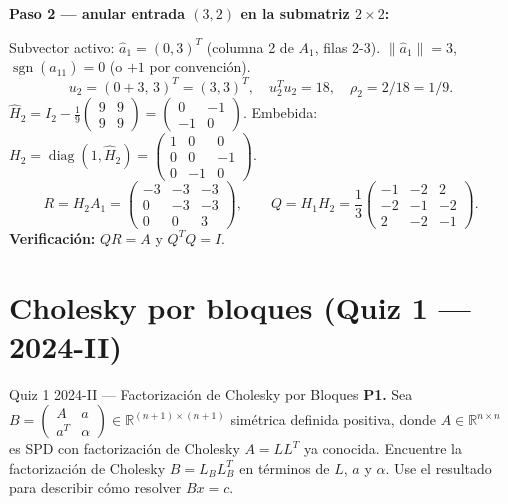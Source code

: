 \documentclass[11pt,a4paper]{article}
\begin{document}
\textbf{Paso 2 --- anular entrada $(3,2)$ en la submatriz $2\times 2$:}

Subvector activo: $\hat{a}_1 = (0,3)^T$ (columna 2 de $A_1$, filas 2-3).
$\|\hat{a}_1\|=3$, $\operatorname{sgn}(\hat{a}_{11})=0$ (o $+1$ por convención).
\[
  u_2 = (0+3,\,3)^T = (3,3)^T,\quad u_2^Tu_2=18, \quad \rho_2 = 2/18 = 1/9.
\]
$\hat{H}_2 = I_2 - \frac{1}{9}\begin{pmatrix}9&9\\9&9\end{pmatrix} = \begin{pmatrix}0&-1\\-1&0\end{pmatrix}$.
Embebida: $H_2 = \operatorname{diag}(1, \hat{H}_2) = \begin{pmatrix}1&0&0\\0&0&-1\\0&-1&0\end{pmatrix}$.
\[
  R = H_2A_1 = \begin{pmatrix}-3&-3&-3\\0&-3&-3\\0&0&3\end{pmatrix}, \qquad
  Q = H_1H_2 = \frac{1}{3}\begin{pmatrix}-1&-2&2\\-2&-1&-2\\2&-2&-1\end{pmatrix}.
\]
\textbf{Verificación:} $QR = A$ y $Q^TQ=I$. \checkmark

\section{Cholesky por bloques (Quiz 1 --- 2024-II)}
\label{sec:q1_2024_p1}

\begin{examen}{Quiz 1 2024-II --- Factorización de Cholesky por Bloques}
\textbf{P1.} Sea $B=\begin{pmatrix}A&a\\a^T&\alpha\end{pmatrix}\in\mathbb{R}^{(n+1)\times(n+1)}$ simétrica definida positiva, donde $A\in\mathbb{R}^{n\times n}$ es SPD con factorización de Cholesky $A=LL^T$ ya conocida. Encuentre la factorización de Cholesky $B=L_BL_B^T$ en términos de $L$, $a$ y $\alpha$. Use el resultado para describir cómo resolver $Bx=c$.
\end{examen}
\end{document}
